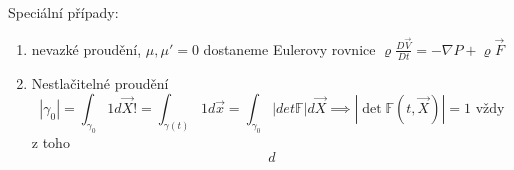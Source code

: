 \documentclass[../main.tex]{subfiles}
\begin{document}
Speciální případy:
\begin{enumerate}
    \item nevazké proudění, $\mu,\mu' = 0$ dostaneme Eulerovy rovnice $\varrho \frac{D\vec{V}}{Dt} = -\nabla P + \varrho \vec{F}$ 
    \item Nestlačitelné proudění \begin{equation}
        |\gamma_0| = \int_{\gamma_0} 1 d\vec{X} != \int_{\gamma(t)} 1 d\vec{x} = \int_{\gamma_0} |det \mathbb{F}| d\vec{X} \implies |\det \mathbb{F} (t,\vec{X})|= 1 \text{ vždy}
    \end{equation} z toho \begin{equation}
        d 
    \end{equation}
\end{enumerate}
\end{document}
